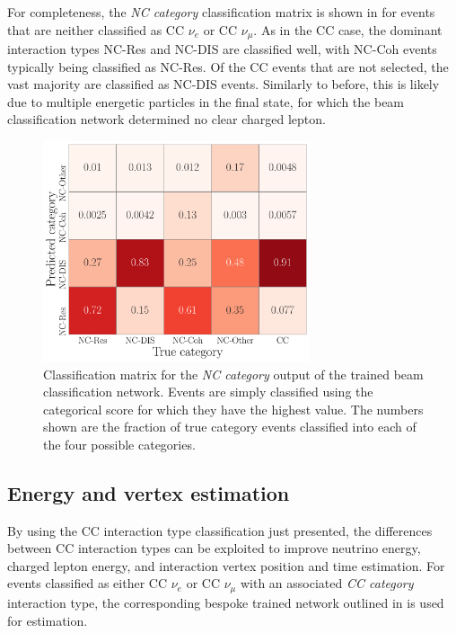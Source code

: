 For completeness, the \emph{NC category} classification matrix is shown in
 for events that are neither classified as CC $\nu_{e}$ or
CC $\nu_{\mu}$. As in the CC case, the dominant interaction types NC-Res and NC-DIS are classified
well, with NC-Coh events typically being classified as NC-Res. Of the CC events that are not
selected, the vast majority are classified as NC-DIS events. Similarly to before, this is likely
due to multiple energetic particles in the final state, for which the beam classification network
determined no clear charged lepton.

\begin{figure} %
    \includegraphics[width=0.7\textwidth]{diagrams/7-results/final_nc_cat_confusion.pdf}
    \caption[Classification matrix for the NC category output of the beam classification network]
    {Classification matrix for the \emph{NC category} output of the trained beam classification
        network. Events are simply classified using the categorical score for which they have the
        highest value. The numbers shown are the fraction of true category events classified into
        each of the four possible categories.}
    \label{fig:final_nc_cat_confusion}
\end{figure}

\subsection{Energy and vertex estimation} %
\label{sec:results_eval_energy} %

By using the CC interaction type classification just presented, the differences between CC
interaction types can be exploited to improve neutrino energy, charged lepton energy, and
interaction vertex position and time estimation. For events classified as either CC $\nu_{e}$ or
CC $\nu_{\mu}$ with an associated \emph{CC category} interaction type, the corresponding bespoke
trained network outlined in  is used for estimation.

